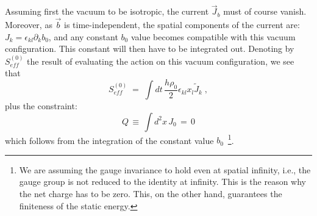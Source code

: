 \documentclass[a4paper,12pt]{article} \tolerance=200
\begin{document}
Assuming first the vacuum to be isotropic, the current ${\vec J}_b$
must of course vanish. Moreover, as ${\vec b}$ is time-independent,
the spatial components of the current are: $J_k = \epsilon_{kl}
\partial_k b_0$, and any constant $b_0$ value becomes compatible with
this vacuum configuration.  This constant will then have to be
integrated out. Denoting by $S^{(0)}_{eff}$ the result of evaluating
the action on this vacuum configuration, we see that
\begin{equation}\label{eq:s0eff}
S^{(0)}_{eff} \;=\; \int dt \, \frac{h \rho_0}{2} \epsilon_{kl} x_l {\tilde J}_k  \;,
\end{equation}
plus the constraint:
\begin{equation}\label{eq:constraint}
Q \,\equiv\, \int d^2x \, J_0 \,=\, 0
\end{equation}
which follows from the integration of the constant value
$b_0$~\footnote{We are assuming the gauge invariance to hold even at
spatial infinity, i.e., the gauge group is not reduced to the
identity at infinity. This is the reason why the net charge has
to be zero. This, on the other hand, guarantees the finiteness of
the static energy.}.
\end{document}

